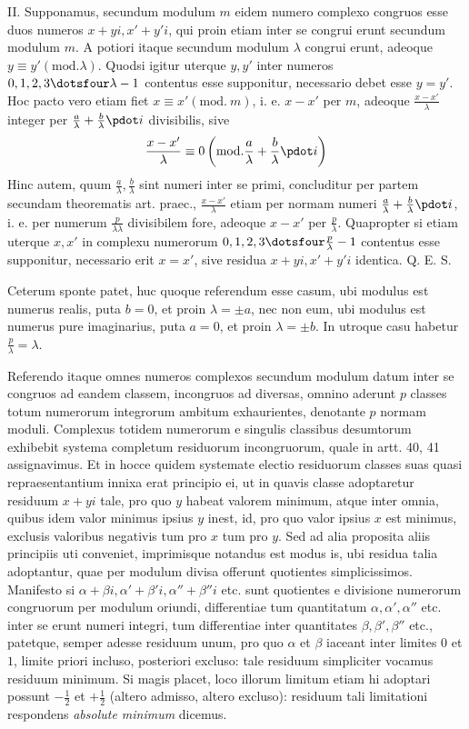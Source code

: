 II. Supponamus, secundum modulum $m$ eidem numero complexo congruos esse duos numeros $x+yi,x'+y'i$, qui proin etiam inter se congrui erunt secundum modulum $m$. A potiori itaque secundum modulum $\lambda$ congrui erunt, adeoque $y\equiv y'(\mathrm{mod.}\lambda)$. Quodsi igitur uterque $y,y'$ inter numeros $0,1,2,3\dotsfour\lambda-1$ contentus esse supponitur, necessario debet esse $y=y'$. Hoc pacto vero etiam fiet $x\equiv x'(\mathrm{mod.}\ m)$, i. e. $x-x'$ per $m$, adeoque $\frac{x-x'}\lambda$ integer per $\frac a\lambda+\frac b\lambda\pdot i$ divisibilis, sive
\[
\frac{x-x'}\lambda\equiv0\left(\mathrm{mod.}\frac a\lambda+\frac b\lambda\pdot i\right)
\]
Hinc autem, quum $\frac a\lambda,\frac b\lambda$ sint numeri inter se primi, concluditur per partem secundam theorematis art. praec., $\frac{x-x'}\lambda$ etiam per normam numeri $\frac a\lambda+\frac b\lambda\pdot i$, i. e. per numerum $\frac p{\lambda\lambda}$ divisibilem fore, adeoque $x-x'$ per $\frac p\lambda$. Quapropter si etiam uterque $x,x'$ in complexu numerorum $0,1,2,3\dotsfour\frac p\lambda-1$ contentus esse supponitur, necessario erit $x=x'$, sive residua $x+yi,x'+y'i$ identica. Q. E. S.

Ceterum sponte patet, huc quoque referendum esse casum, ubi modulus est numerus realis, puta $b=0$, et proin $\lambda=\pm a$, nec non eum, ubi modulus est numerus pure imaginarius, puta $a=0$, et proin $\lambda=\pm b$. In utroque casu habetur $\frac p\lambda=\lambda$.

%
Referendo itaque omnes numeros complexos secundum modulum datum inter se congruos ad eandem classem, incongruos ad diversas, omnino aderunt $p$ classes totum numerorum integrorum ambitum exhaurientes, denotante $p$ normam moduli. Complexus totidem numerorum e singulis classibus desumtorum exhibebit systema completum residuorum incongruorum, quale in artt. 40, 41 assignavimus. Et in hocce quidem systemate electio residuorum classes suas quasi repraesentantium innixa erat principio ei, ut in quavis classe adoptaretur residuum $x+yi$ tale, pro quo $y$ habeat valorem minimum, atque inter omnia, quibus idem valor minimus ipsius $y$ inest, id, pro quo valor ipsius $x$ est minimus, exclusis valoribus negativis tum pro $x$ tum pro $y$. Sed ad alia proposita aliis principiis uti conveniet, imprimisque notandus est modus is, ubi residua talia adoptantur, quae per modulum divisa offerunt quotientes simplicissimos. Manifesto si $\alpha+\beta i,\alpha'+\beta'i,\alpha''+\beta''i$ etc. sunt quotientes e divisione numerorum congruorum per modulum oriundi, differentiae tum quantitatum $\alpha,\alpha',\alpha''$ etc. inter se erunt numeri integri, tum differentiae inter quantitates $\beta,\beta',\beta''$ etc., patetque, semper adesse residuum unum, pro quo $\alpha$ et $\beta$ iaceant inter limites $0$ et $1$, limite priori incluso, posteriori excluso: tale residuum simpliciter vocamus residuum minimum. Si magis placet, loco illorum limitum etiam hi adoptari possunt $-\frac12$ et $+\frac12$ (altero admisso, altero excluso): residuum tali limitationi respondens \emph{absolute minimum} dicemus.

